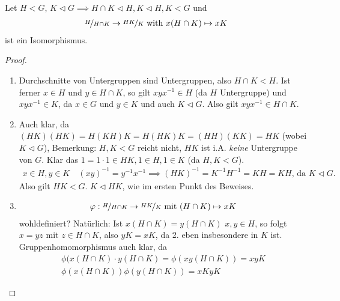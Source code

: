 \begin{proposition}
	Let $H < G$, $K \lhd G \implies H\cap K \lhd H, K\lhd H,K < G$ und 
	\begin{align*}
		\lnkset{H}{H \cap K} \to \lnkset{HK}{K} \with x(H\cap K) \mapsto xK
	\end{align*}
	ist ein Isomorphismus.
\end{proposition}
\begin{proof}
	\begin{enumerate}
		\item Durchschnitte von Untergruppen sind Untergruppen, also $H \cap K < H$. Ist ferner $x \in H$ und $y \in H\cap K$, so gilt $xyx^{-1} \in H$ (da $H$ Untergruppe) und $xyx^{-1} \in K$, da $x \in G$ und $y \in K$ und auch $K \lhd G$. Also gilt $xyx^{-1} \in H \cap K$.
		\item Auch klar, da $(HK)(HK) = H(KH)K = H(HK)K = (HH)(KK) = HK$ (wobei $K \lhd G$), Bemerkung: $H,K < G$ reicht nicht, $HK$ ist i.A. \emph{keine} Untergruppe von $G$. Klar das $1 = 1\cdot 1 \in HK, 1 \in H, 1\in K$ (da $H,K < G$).
		\begin{align*}
			x \in H, y\in K\quad (xy)^{-1} = y^{-1}x^{-1} \implies (HK)^{-1} = K^{-1}H^{-1} = KH = KH\text{, da } K\lhd G.
		\end{align*}
		Also gilt $HK < G$. $K \lhd HK$, wie im ersten Punkt des Beweises.
		\item \begin{align*}
		\phi: \lnkset{H}{H \cap K} \to \lnkset{HK}{K} \mit (H \cap K) \mapsto xK
		\end{align*}
		wohldefiniert? Natürlich: Ist $x(H \cap K) = y (H\cap K)$ $x,y \in H$, so folgt $x = yz$ mit $z \in H \cap K$, also $yK = xK$, da 2. eben insbesondere in $K$ ist. Gruppenhomomorphismus auch klar, da
		\begin{align*}
			\phi(x(H \cap K) \cdot y(H \cap K) = \phi(xy(H \cap K)) = xyK\\
			\phi(x(H\cap K))\phi(y(H\cap K)) = xKyK
		\end{align*}
	\end{enumerate}
\end{proof}
